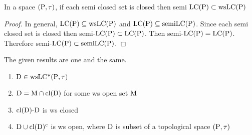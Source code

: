 \begin{thm}\label{thm7.2.9}
In a space $(\mathrm{P}, \tau)$, if each semi closed set is closed then semi $\mathrm{LC}(\mathrm{P}) \subset \mathrm{ws}\mathrm{LC}(\mathrm{P})$
\end{thm}

\begin{proof}
In general, $\mathrm{LC}(\mathrm{P}) \subseteq \mathrm{ws}\mathrm{LC}(\mathrm{P})$ and $\mathrm{LC}(\mathrm{P}) \subseteq \mathrm{semi}\mathrm{LC}(\mathrm{P})$. Since each semi closed set is closed then semi-$\mathrm{LC}(\mathrm{P}) \subset \mathrm{LC}(\mathrm{P})$. Then semi-$\mathrm{LC}(\mathrm{P}) = \mathrm{LC}(\mathrm{P})$. Therefore semi-$\mathrm{LC}(\mathrm{P}) \subset \mathrm{semi}\mathrm{LC}(\mathrm{P})$.
\end{proof}

\begin{thm}\label{thm7.2.10}
The given results are one and the same.
\begin{enumerate}[(1)]
\item $\mathrm{D} \in\mathrm{ws}\mathrm{LC}\text{*}(\mathrm{P}, \tau)$
\item $\mathrm{D} = \mathrm{M} \cap \mathrm{cl}(\mathrm{D})$ for some ws open set $\mathrm{M}$
\item $\mathrm{cl}(\mathrm{D})\text{-}\mathrm{D}$ is ws closed
\item $\mathrm{D} \cup \mathrm{cl}(\mathrm{D})^{\text{c}}$ is ws open, where $\mathrm{D}$ is subset of a topological space $(\mathrm{P}, \tau)$
\end{enumerate}
\end{thm}

\newpage

